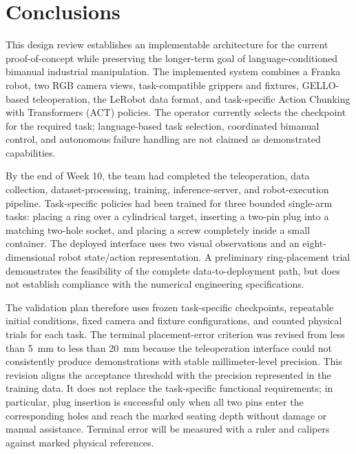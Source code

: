 \documentclass[12pt, letterpaper]{article}
\begin{document}


\section{Conclusions}

This design review establishes an implementable architecture for the current
proof-of-concept while preserving the longer-term goal of language-conditioned
bimanual industrial manipulation. The implemented system combines a Franka
robot, two RGB camera views, task-compatible grippers and fixtures, GELLO-based
teleoperation, the LeRobot data format, and task-specific Action Chunking with
Transformers (ACT) policies. The operator currently selects the checkpoint for
the required task; language-based task selection, coordinated bimanual control,
and autonomous failure handling are not claimed as demonstrated capabilities.

By the end of Week 10, the team had completed the teleoperation, data
collection, dataset-processing, training, inference-server, and robot-execution
pipeline. Task-specific policies had been trained for three bounded single-arm
tasks: placing a ring over a cylindrical target, inserting a two-pin plug
into a matching two-hole socket, and placing a screw completely inside a
small container. The deployed interface uses two visual observations and an
eight-dimensional robot state/action representation. A preliminary ring-placement trial demonstrates the feasibility of the
complete data-to-deployment path, but does not establish compliance with the
numerical engineering specifications.

The validation plan therefore uses frozen task-specific checkpoints,
repeatable initial conditions, fixed camera and fixture configurations, and
counted physical trials for each task. The terminal placement-error criterion
was revised from less than 5~mm to less than 20~mm because the teleoperation
interface could not consistently produce demonstrations with stable
millimeter-level precision. This revision aligns the acceptance threshold with
the precision represented in the training data. It does not replace the
task-specific functional requirements; in particular, plug insertion is
successful only when all two pins enter the corresponding holes and reach the
marked seating depth without damage or manual assistance. Terminal error will
be measured with a ruler and calipers against marked physical references.
\end{document}
